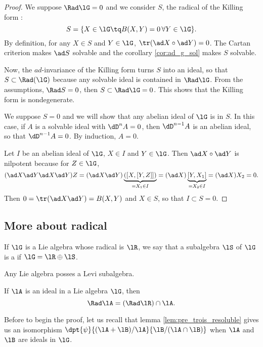 \begin{proof}
We suppose $\Rad\lG=0$ and we consider $S$, the radical of the Killing form :
\[
   S=\{X\in\lG\tq B(X,Y)=0\,\forall Y\in\lG\}.
\]
By definition, for any $X\in S$ and $Y\in\lG$, $\tr(\ad X\circ\ad Y)=0$. The Cartan criterion makes $\ad S$ solvable and the corollary \ref{cor:ad_g_sol} makes $S$ solvable.

Now, the $ad$-invariance of the Killing form turns $S$ into an ideal, so that $S\subset\Rad(\lG)$ because any solvable ideal is contained in $\Rad\lG$. From the assumptions, $\Rad S=0$, then $S\subset\Rad\lG=0$. This shows that the Killing form is nondegenerate.

We suppose $S=0$ and we will show that any abelian ideal of $\lG$ is in $S$. In this case, if $A$ is a solvable ideal with $\dD^nA=0$, then $\dD^{n-1}A$ is an abelian ideal, so that $\dD^{n-1}A=0$. By induction, $A=0$.

Let $I$ be an abelian ideal of $\lG$, $X\in I$ and $Y\in\lG$. Then $\ad X\circ\ad Y$ is nilpotent because for $Z\in\lG$,
\begin{equation}
  (\ad X\ad Y\ad X\ad Y)Z=(\ad X\ad Y)\underbrace{( [X,[Y,Z]] )}_{=X_1\in I}
                         =(\ad X)\underbrace{[Y,X_1]}_{=X_2\in I}
             =(\ad X)X_2
             =0.
\end{equation}
Then $0=\tr(\ad X\ad Y)=B(X,Y)$ and $X\in S$, so that $I\subset S=0$.

\end{proof}

\subsection{More about radical}

If $\lG$ is a Lie algebra whose radical is $\lR$, we say that a subalgebra $\lS$ of $\lG$ is a  if $\lG=\lR\oplus\lS$.

Any Lie algebra posses a Levi subalgebra.

\begin{lemma}
If $\lA$ is an ideal in a Lie algebra $\lG$, then 
\[
  \Rad\lA=(\Rad\lR)\cap\lA.
\]
\label{lem:rad_ideal}
\end{lemma}

Before to begin the proof, let us recall that lemma \ref{lem:pre_trois_resoluble} gives us an isomorphism $\dpt{\psi}{(\lA+\lB)/\lA}{\lB/(\lA\cap\lB)}$ when $\lA$ and $\lB$ are ideals in $\lG$.

